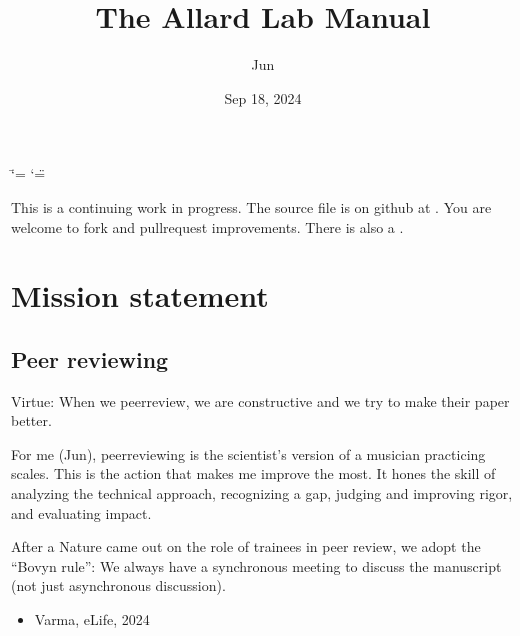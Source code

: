 \documentclass[letterpaper,10pt,english]{sphinxmanual}
\title{The Allard Lab Manual}
\date{Sep 18, 2024}
\author{Jun}
\begin{document}
\ifdefined\shorthandoff
  \ifnum\catcode`\=\string=\active\shorthandoff{=}\fi
  \ifnum\catcode`\"=\active{}\fi
\fi

\pagestyle{empty}
\sphinxmaketitle
\pagestyle{plain}
\sphinxtableofcontents
\pagestyle{normal}
\label{\detokenize{index::doc}}


\sphinxAtStartPar
This is a continuing work in progress.
The source file is on github at .
You are welcome to fork and pull\sphinxhyphen{}request improvements.
There is also a .

\sphinxstepscope


\chapter{Mission statement}
\label{\detokenize{01OurMission:mission-statement}}\label{\detokenize{01OurMission::doc}}
\sphinxstepscope


\section{Peer reviewing}
\label{\detokenize{PeerReviewing:peer-reviewing}}\label{\detokenize{PeerReviewing:id1}}\label{\detokenize{PeerReviewing::doc}}
\sphinxAtStartPar
Virtue: When we peer\sphinxhyphen{}review, we are constructive and we try to make their paper better.

\sphinxAtStartPar
For me (Jun), peer\sphinxhyphen{}reviewing is the scientist’s version of a musician practicing scales. This is the action that makes me improve the most. It hones the skill of analyzing the technical approach, recognizing a gap, judging and improving rigor, and evaluating impact.

\sphinxAtStartPar
After a Nature  came out on the role of trainees in peer review, we adopt the “Bovyn rule”: We always have a synchronous meeting to discuss the manuscript (not just asynchronous discussion).
\begin{itemize}
\item {} 
\sphinxAtStartPar
Varma,  eLife, 2024

\end{itemize}
\end{document}
